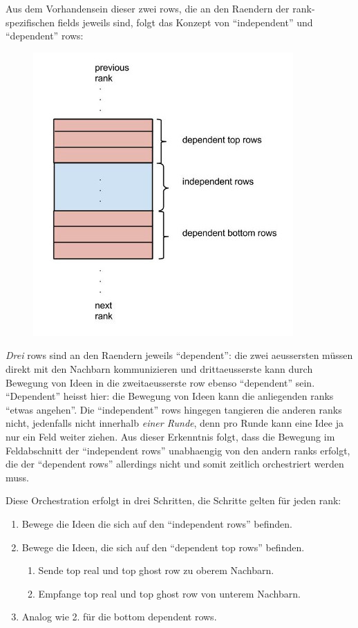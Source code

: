 Aus dem Vorhandensein dieser zwei rows, die an den Raendern der
rank-spezifischen fields jeweils sind, folgt das Konzept von
``independent'' und ``dependent'' rows:

\begin{figure}[htbp]
\centering
\includegraphics{pics/dependent-rows.jpg}
\end{figure}

\emph{Drei} rows sind an den Raendern jeweils ``dependent'': die zwei
aeussersten müssen direkt mit den Nachbarn kommunizieren und
drittaeusserste kann durch Bewegung von Ideen in die zweitaeusserste row
ebenso ``dependent'' sein. ``Dependent'' heisst hier: die Bewegung von
Ideen kann die anliegenden ranks ``etwas angehen''. Die ``independent''
rows hingegen tangieren die anderen ranks nicht, jedenfalls nicht
innerhalb \emph{einer Runde}, denn pro Runde kann eine Idee ja nur ein
Feld weiter ziehen. Aus dieser Erkenntnis folgt, dass die Bewegung im
Feldabschnitt der ``independent rows'' unabhaengig von den andern ranks
erfolgt, die der ``dependent rows'' allerdings nicht und somit zeitlich
orchestriert werden muss.

Diese Orchestration erfolgt in drei Schritten, die Schritte gelten für
jeden rank:

\begin{enumerate}
\def\labelenumi{\arabic{enumi}.}
\itemsep1pt\parskip0pt
\item
  Bewege die Ideen die sich auf den ``independent rows'' befinden.
\item
  Bewege die Ideen, die sich auf den ``dependent top rows'' befinden.

  \begin{enumerate}
  \def\labelenumii{\arabic{enumii}.}
  \itemsep1pt\parskip0pt
  \item
    Sende top real und top ghost row zu oberem Nachbarn.
  \item
    Empfange top real und top ghost row von unterem Nachbarn.
  \end{enumerate}
\item
  Analog wie 2. für die bottom dependent rows.
\end{enumerate}

